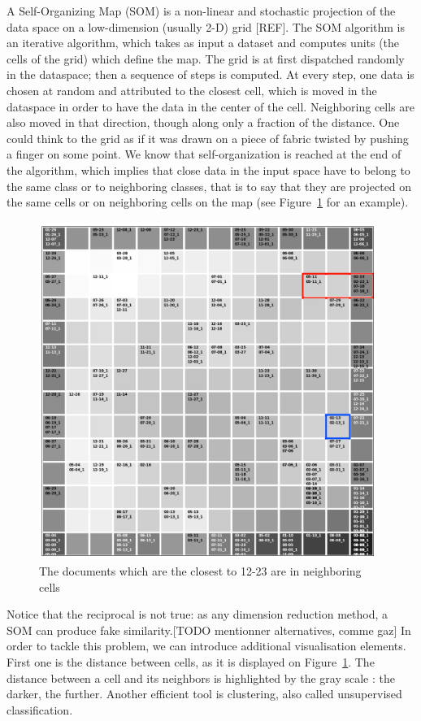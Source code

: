 \documentclass[a4paper,11pt]{article}
\begin{document}
A Self-Organizing Map (SOM) is a non-linear and stochastic projection of the data space on a low-dimension (usually 2-D) grid [REF]. The SOM algorithm is an iterative algorithm, which takes as input a dataset and computes units (the cells of the grid) which define the map. The grid is at first dispatched randomly in the dataspace; then a sequence of steps is computed. At every step, one data is chosen at random and attributed to the closest cell, which is moved in the dataspace in order to have the data in the center of the cell. Neighboring cells are also moved in that direction, though along only a fraction of the distance. One could think to the grid as if it was drawn on a piece of fabric twisted by pushing a finger on some point. We know that self-organization is reached at the end of the algorithm, which implies that close data in the input space have to belong to the same class or to neighboring classes, that is to say that they are projected on the same cells or on neighboring cells on the map (see Figure~\ref{fig:som_pb} for an example).\\

\begin{figure}
\begin{center}
\includegraphics[width=11cm, height=11cm, keepaspectratio]{./img/som_1}
\caption{The documents which are the closest to 12-23 are in neighboring cells}
\label{fig:som_pb}
\end{center}
\end{figure}

Notice that the reciprocal is not true: as any dimension reduction method, a SOM can produce fake similarity.[TODO mentionner alternatives, comme gaz] In order to tackle this problem, we can introduce additional visualisation elements. First one is the distance between cells, as it is displayed on Figure~\ref{fig:som_pb}. The distance between a cell and its neighbors is highlighted by the gray scale : the darker, the further. Another efficient tool is clustering, also called unsupervised classification.
\end{document}
